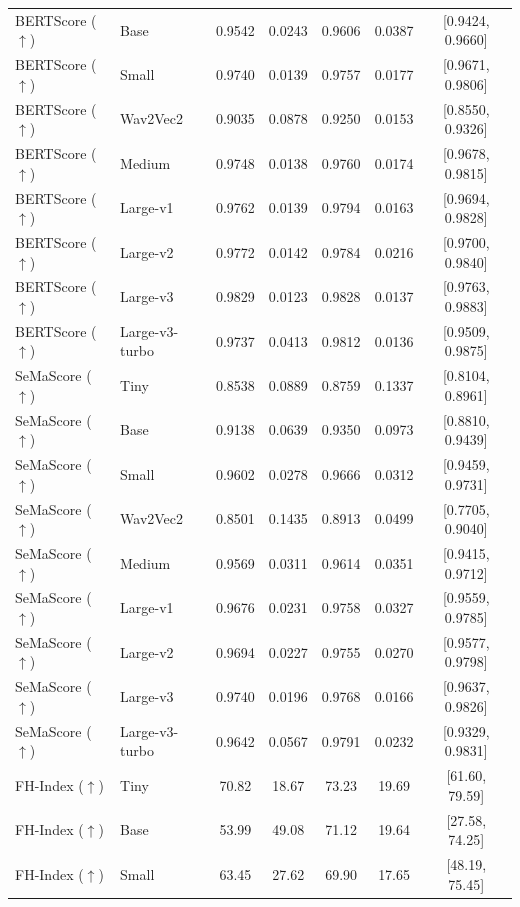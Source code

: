\begin{table}[!t]
\begin{tabular}{llccccc}
BERTScore ($\uparrow$) & Base & 0.9542 & 0.0243 & 0.9606 & 0.0387 & [0.9424, 0.9660] \\
BERTScore ($\uparrow$) & Small & 0.9740 & 0.0139 & 0.9757 & 0.0177 & [0.9671, 0.9806] \\
BERTScore ($\uparrow$) & Wav2Vec2 & 0.9035 & 0.0878 & 0.9250 & 0.0153 & [0.8550, 0.9326] \\
BERTScore ($\uparrow$) & Medium & 0.9748 & 0.0138 & 0.9760 & 0.0174 & [0.9678, 0.9815] \\
BERTScore ($\uparrow$) & Large-v1 & 0.9762 & 0.0139 & 0.9794 & 0.0163 & [0.9694, 0.9828] \\
BERTScore ($\uparrow$) & Large-v2 & 0.9772 & 0.0142 & 0.9784 & 0.0216 & [0.9700, 0.9840] \\
BERTScore ($\uparrow$) & Large-v3 & 0.9829 & 0.0123 & 0.9828 & 0.0137 & [0.9763, 0.9883] \\
BERTScore ($\uparrow$) & Large-v3-turbo & 0.9737 & 0.0413 & 0.9812 & 0.0136 & [0.9509, 0.9875] \\
\midrule
SeMaScore ($\uparrow$) & Tiny & 0.8538 & 0.0889 & 0.8759 & 0.1337 & [0.8104, 0.8961] \\
SeMaScore ($\uparrow$) & Base & 0.9138 & 0.0639 & 0.9350 & 0.0973 & [0.8810, 0.9439] \\
SeMaScore ($\uparrow$) & Small & 0.9602 & 0.0278 & 0.9666 & 0.0312 & [0.9459, 0.9731] \\
SeMaScore ($\uparrow$) & Wav2Vec2 & 0.8501 & 0.1435 & 0.8913 & 0.0499 & [0.7705, 0.9040] \\
SeMaScore ($\uparrow$) & Medium & 0.9569 & 0.0311 & 0.9614 & 0.0351 & [0.9415, 0.9712] \\
SeMaScore ($\uparrow$) & Large-v1 & 0.9676 & 0.0231 & 0.9758 & 0.0327 & [0.9559, 0.9785] \\
SeMaScore ($\uparrow$) & Large-v2 & 0.9694 & 0.0227 & 0.9755 & 0.0270 & [0.9577, 0.9798] \\
SeMaScore ($\uparrow$) & Large-v3 & 0.9740 & 0.0196 & 0.9768 & 0.0166 & [0.9637, 0.9826] \\
SeMaScore ($\uparrow$) & Large-v3-turbo & 0.9642 & 0.0567 & 0.9791 & 0.0232 & [0.9329, 0.9831] \\
\midrule
FH-Index ($\uparrow$) & Tiny & 70.82 & 18.67 & 73.23 & 19.69 & [61.60, 79.59] \\
FH-Index ($\uparrow$) & Base & 53.99 & 49.08 & 71.12 & 19.64 & [27.58, 74.25] \\
FH-Index ($\uparrow$) & Small & 63.45 & 27.62 & 69.90 & 17.65 & [48.19, 75.45] \\

\end{tabular}
\end{table}
